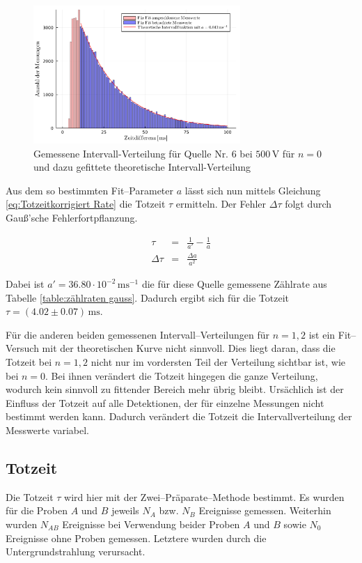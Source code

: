 \documentclass[12pt,a4paper]{scrartcl}
\numberwithin{equation}{section} %
\begin{document}
\begin{figure}
	\centering
	\includegraphics[width=0.7\textwidth]{../media/B3.1/intervalFit.pdf}
	\caption{Gemessene Intervall-Verteilung für Quelle Nr. 6 bei $500 \mathrm{\, V}$ für $n = 0$ und dazu gefittete theoretische Intervall-Verteilung}
	\label{fig:intervalFit}
\end{figure}

Aus dem so bestimmten Fit--Parameter $a$ lässt sich nun mittels Gleichung \eqref{eq:Totzeitkorrigiert Rate} die Totzeit $\tau$ ermitteln. Der Fehler $\Delta \tau$ folgt durch Gauß'sche Fehlerfortpflanzung.

\begin{eqnarray}
	\tau &=& \frac{1}{a'} - \frac{1}{a} \\
	\Delta \tau &=& \frac{\Delta a}{a^2}
\end{eqnarray}

\noindent
Dabei ist $a' = 36.80 \cdot 10^{-2} \mathrm{\,ms^{-1}}$ die für diese Quelle gemessene Zählrate aus Tabelle \ref{table:zählraten gauss}. Dadurch ergibt sich für die Totzeit $\tau = (4.02 \pm 0.07) \mathrm{\, ms}$.

Für die anderen beiden gemessenen Intervall--Verteilungen für $n = 1,2$ ist ein Fit--Versuch mit der theoretischen Kurve nicht sinnvoll. Dies liegt daran, dass die Totzeit bei $n = 1,2$ nicht nur im vordersten Teil der Verteilung sichtbar ist, wie bei $n = 0$. Bei ihnen verändert die Totzeit hingegen die ganze Verteilung, wodurch kein sinnvoll zu fittender Bereich mehr übrig bleibt. Ursächlich ist der Einfluss der Totzeit auf alle Detektionen, der für einzelne Messungen nicht bestimmt werden kann. Dadurch verändert die Totzeit die Intervallverteilung der Messwerte variabel.

\hypertarget{Totzeit bestimmen}{\subsection{Totzeit}\label{Totzeit bestimmen}}
Die Totzeit $\tau$ wird hier mit der Zwei--Präparate--Methode bestimmt. Es wurden für die Proben $A$ und $B$ jeweils $N_A$ bzw. $N_B$ Ereignisse gemessen. Weiterhin wurden $N_{AB}$ Ereignisse bei Verwendung beider Proben $A$ und $B$ sowie $N_0$ Ereignisse ohne Proben gemessen. Letztere wurden durch die Untergrundstrahlung verursacht.
\end{document}
